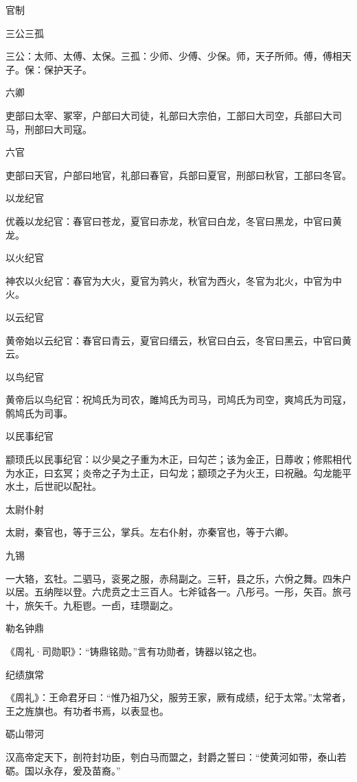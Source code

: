 \documentclass[a4paper,12pt,UTF8,twoside]{ctexbook}
\begin{document}
    官制
    
    三公三孤
    
    三公：太师、太傅、太保。三孤：少师、少傅、少保。师，天子所师。傅，傅相天子。保：保护天子。
    
    六卿
    
    吏部曰太宰、冢宰，户部曰大司徒，礼部曰大宗伯，工部曰大司空，兵部曰大司马，刑部曰大司寇。
    
    六官
    
    吏部曰天官，户部曰地官，礼部曰春官，兵部曰夏官，刑部曰秋官，工部曰冬官。
    
    以龙纪官
    
    优羲以龙纪官：春官曰苍龙，夏官曰赤龙，秋官曰白龙，冬官曰黑龙，中官曰黄龙。
    
    以火纪官
    
    神农以火纪官：春官为大火，夏官为鹑火，秋官为西火，冬官为北火，中官为中火。
    
    以云纪官
    
    黄帝始以云纪官：春官曰青云，夏官曰缙云，秋官曰白云，冬官曰黑云，中官曰黄云。
    
    以鸟纪官
    
    黄帝后以鸟纪官：祝鸠氏为司农，雎鸠氏为司马，司鸠氏为司空，爽鸠氏为司寇，鹘鸠氏为司事。
    
    以民事纪官
    
    颛顼氏以民事纪官：以少昊之子重为木正，曰勾芒；该为金正，日蓐收；修熙相代为水正，曰玄冥；炎帝之子为土正，曰勾龙；颛顼之子为火王，曰祝融。勾龙能平水土，后世祀以配社。
    
    太尉仆射
    
    太尉，秦官也，等于三公，掌兵。左右仆射，亦秦官也，等于六卿。
    
    九锡
    
    一大辂，玄牡。二驷马，衮冕之服，赤舄副之。三轩，县之乐，六佾之舞。四朱户以居。五纳陛以登。六虎贲之士三百人。七斧钺各一。八彤弓。一彤，矢百。旅弓十，旅矢千。九秬鬯。一卣，珪瓒副之。
    
    勒名钟鼎
    
    《周礼·司勋职》：“铸鼎铭勋。”言有功勋者，铸器以铭之也。
    
    纪绩旗常
    
    《周礼》：王命君牙曰：“惟乃祖乃父，服劳王家，厥有成绩，纪于太常。”太常者，王之旌旗也。有功者书焉，以表显也。
    
    砺山带河
    
    汉高帝定天下，剖符封功臣，刳白马而盟之，封爵之誓曰：“使黄河如带，泰山若砺。国以永存，爰及苗裔。”
    
\end{document}
